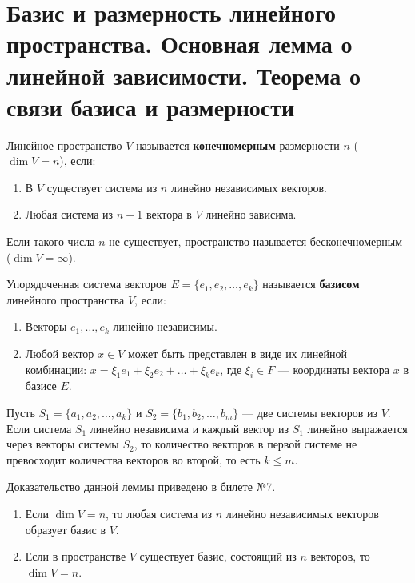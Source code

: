 \section{Базис и размерность линейного пространства. Основная лемма о линейной зависимости. Теорема о связи базиса и размерности}

\begin{definition}
Линейное пространство $V$ называется \textbf{конечномерным} размерности $n$ ($\dim V = n$), если:
\begin{enumerate}
    \item В $V$ существует система из $n$ линейно независимых векторов.
    \item Любая система из $n+1$ вектора в $V$ линейно зависима.
\end{enumerate}
Если такого числа $n$ не существует, пространство называется бесконечномерным ($\dim V = \infty$).
\end{definition}

\begin{definition}
Упорядоченная система векторов $E = \{e_1, e_2, \dots, e_k\}$ называется \textbf{базисом} линейного пространства $V$, если:
\begin{enumerate}
    \item Векторы $e_1, \dots, e_k$ линейно независимы.
    \item Любой вектор $x \in V$ может быть представлен в виде их линейной комбинации: $x = \xi_1 e_1 + \xi_2 e_2 + \dots + \xi_k e_k$, где $\xi_i \in F$ --- координаты вектора $x$ в базисе $E$.
\end{enumerate}
\end{definition}

\begin{lemma}
Пусть $S_1 = \{a_1, a_2, \dots, a_k\}$ и $S_2 = \{b_1, b_2, \dots, b_m\}$ --- две системы векторов из $V$. Если система $S_1$ линейно независима и каждый вектор из $S_1$ линейно выражается через векторы системы $S_2$, то количество векторов в первой системе не превосходит количества векторов во второй, то есть $k \le m$.
\end{lemma}
\begin{remark}
Доказательство данной леммы приведено в билете №7.
\end{remark}

\begin{theorem}
\begin{enumerate}
    \item Если $\dim V = n$, то любая система из $n$ линейно независимых векторов образует базис в $V$.
    \item Если в пространстве $V$ существует базис, состоящий из $n$ векторов, то $\dim V = n$.
\end{enumerate}
\end{theorem}

